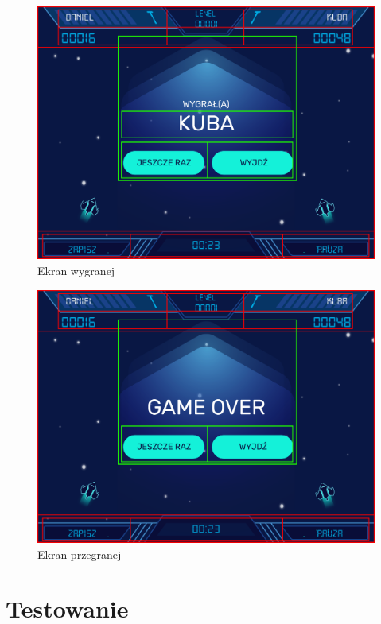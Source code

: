 \documentclass[a4paper]{article}
\begin{document}
\begin{figure}[H]
    \centering
    \includegraphics[width=1\textwidth]{img/ekran-wygrana-grid.png}
    \caption{Ekran wygranej}
    \label{fig:wygrana}
\end{figure}

\begin{figure}[H]
    \centering
    \includegraphics[width=1\textwidth]{img/ekran-game-over-grid.png}
    \caption{Ekran przegranej}
    \label{fig:game over}
\end{figure}

\section{Testowanie}
\end{document}
